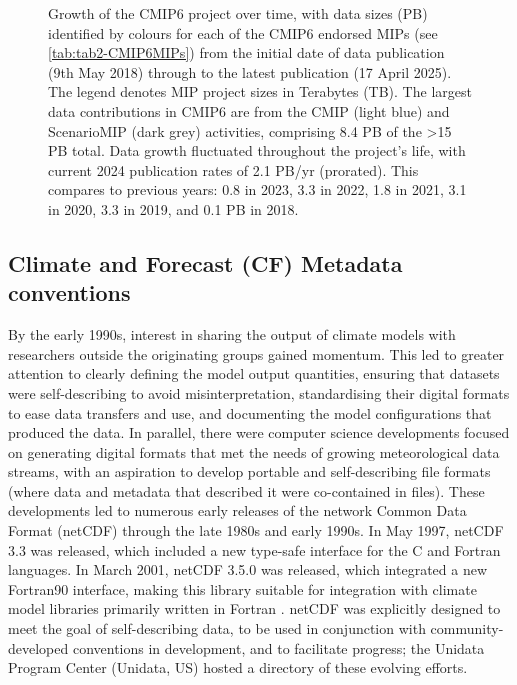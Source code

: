 \documentclass[manuscript]{copernicus}
\def\cred#1{{\color{red}#1}}
\begin{document}
\begin{figure}
    \centering
    
    \caption{Growth of the CMIP6 project over time, with data sizes (PB) identified by colours for each of the CMIP6 endorsed MIPs (see \autoref{tab:tab2-CMIP6MIPs}) from the initial date of data publication (9th May 2018) through to the latest publication (17 April 2025). The legend denotes MIP project sizes in Terabytes (TB). The largest data contributions in CMIP6 are from the CMIP (light blue) and ScenarioMIP (dark grey) activities, comprising 8.4 PB of the >15 PB total. Data growth fluctuated throughout the project's life, with current 2024 publication rates of 2.1 PB/yr (prorated). This compares to previous years: 0.8 in 2023, 3.3 in 2022, 1.8 in 2021, 3.1 in 2020, 3.3 in 2019, and 0.1 PB in 2018.}
    \label{fig:fig2-CMIP6DataGrowth}
\end{figure}


\subsection{Climate and Forecast (CF) Metadata conventions}
\label{sec:CFConventions}

By the early 1990s, interest in sharing the output of climate models with researchers outside the originating groups gained momentum. This led to greater attention to clearly defining the model output quantities, ensuring that datasets were self-describing to avoid misinterpretation, standardising their digital formats to ease data transfers and use, and documenting the model configurations that produced the data. In parallel, there were computer science developments focused on generating digital formats that met the needs of growing meteorological data streams, with an aspiration to develop portable and self-describing file formats (where data and metadata that described it were co-contained in files). These developments led to numerous early releases of the network Common Data Format (netCDF) through the late 1980s and early 1990s. In May 1997, netCDF 3.3 was released, which included a new type-safe interface for the C and Fortran languages. In March 2001, netCDF 3.5.0 was released, which integrated a new Fortran90 interface, making this library suitable for integration with climate model libraries primarily written in Fortran \citep{university_corporation_of_atmospheric_research_netcdf_2021}. netCDF was explicitly designed to meet the goal of self-describing data, to be used in conjunction with community-developed conventions in development, and to facilitate progress; the Unidata Program Center (Unidata, US) hosted a directory of these evolving efforts.
\end{document}
